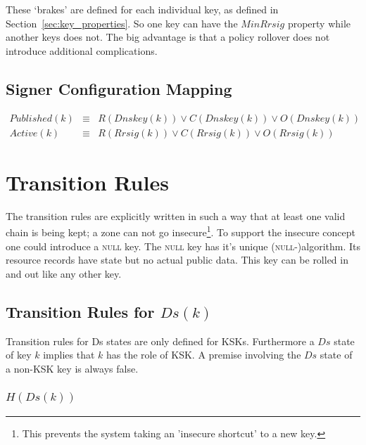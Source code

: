 \documentclass[twoside, a4paper]{article}
\begin{document}
These `brakes' are defined for each individual key, as defined in 
Section~\ref{sec:key_properties}. So one key can have the $MinRrsig$ 
property while another keys does not. The big advantage is that a 
policy rollover does not introduce additional complications. 



\subsection{Signer Configuration Mapping}

\begin{eqnarray}
Published(k) &\equiv & R(Dnskey(k)) \vee C(Dnskey(k)) \vee O(Dnskey(k)) \\
Active(k) &\equiv & R(Rrsig(k)) \vee C(Rrsig(k)) \vee O(Rrsig(k))
\end{eqnarray}

\section{Transition Rules}

The transition rules are explicitly written in such a way that at 
least one valid chain is being kept; a zone can not go insecure\footnote{
This prevents the system taking an 'insecure shortcut' to a new key.}. To support the insecure concept one could introduce a 
\textsc{null} key. The \textsc{null} key has it's unique (\textsc 
{null}-)algorithm. Its resource records have state but no actual 
public data. This key can be rolled in and out like any other key.

\subsection{Transition Rules for $Ds(k)$}

Transition rules for Ds states are only defined for KSKs. Furthermore
a $Ds$ state of key $k$ implies that $k$ has the role of KSK. A premise 
involving the $Ds$ state of a non-KSK key is always false.

\subsubsection{$H(Ds(k))$}
\end{document}
